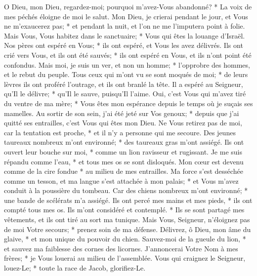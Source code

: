  O Dieu, mon Dieu, regardez-moi; pourquoi m'avez-Vous abandonné? * La voix de mes péchés éloigne de moi le salut.
\versseparator
 Mon Dieu, je crierai pendant le jour, et Vous ne m'exaucerez pas; * et pendant la nuit, et l'on ne me l'imputera point à folie.
\versseparator
 Mais Vous, Vous habitez dans le sanctuaire; * Vous qui êtes la louange d'Israël.
\versseparator
 Nos pères ont espéré en Vous; * ils ont espéré, et Vous les avez délivrés.
\versseparator
 Ils ont crié vers Vous, et ils ont été sauvés; * ils ont espéré en Vous, et ils n'ont point été confondus.
\versseparator
 Mais moi, je suis un ver, et non un homme; * l'opprobre des hommes, et le rebut du peuple.
\versseparator
 Tous ceux qui m'ont vu se sont moqués de moi; * de leurs lèvres ils ont proféré l'outrage, et ils ont branlé la tête.
\versseparator
 Il a espéré au Seigneur, qu'Il le délivre; * qu'Il le sauve, puisqu'Il l'aime.
\versseparator
 Oui, c'est Vous qui m'avez tiré du ventre de ma mère; * Vous êtes mon espérance depuis le temps où je suçais ses mamelles.
\versseparator
 Au sortir de son sein, j'ai été jeté sur Vos genoux; * depuis que j'ai quitté ses entrailles, c'est Vous qui êtes mon Dieu.
\versseparator
 Ne Vous retirez pas de moi, car la tentation est proche, * et il n'y a personne qui me secoure.
\versseparator
 Des jeunes taureaux nombreux m'ont environné; * des taureaux gras m'ont assiégé.
\versseparator
 Ils ont ouvert leur bouche sur moi, * comme un lion ravisseur et rugissant.
\versseparator
 Je me suis répandu comme l'eau, * et tous mes os se sont disloqués.
\versseparator
 Mon cœur est devenu comme de la cire fondue * au milieu de mes entrailles.
\versseparator
 Ma force s'est desséchée comme un tesson, et ma langue s'est attachée à mon palais; * et Vous m'avez conduit à la poussière du tombeau.
\versseparator
 Car des chiens nombreux m'ont environné; * une bande de scélérats m'a assiégé.
\versseparator
 Ils ont percé mes mains et mes pieds, * ils ont compté tous mes os. 
\versseparator
 Ils m'ont considéré et contemplé. * Ils se sont partagé mes vêtements, et ils ont tiré au sort ma tunique.
\versseparator
 Mais Vous, Seigneur, n'éloignez pas de moi Votre secours; * prenez soin de ma défense.
\versseparator
 Délivrez, ô Dieu, mon âme du glaive, * et mon unique du pouvoir du chien.
\versseparator
 Sauvez-moi de la gueule du lion, * et sauvez ma faiblesse des cornes des licornes.
\versseparator
 J'annoncerai Votre Nom à mes frères; * je Vous louerai au milieu de l'assemblée.
\versseparator
 Vous qui craignez le Seigneur, louez-Le; * toute la race de Jacob, glorifiez-Le.
